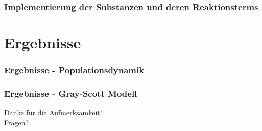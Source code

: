 \documentclass[aspectratio=32]{beamer}
\newcommand{\sectionframe}{\begin{frame}
	\begin{center}
		\textcolor{simtechred}{\Large\insertsection}
	\end{center}
\end{frame}}
\begin{document}
\begin{frame}
\frametitle{Implementierung der Substanzen und deren Reaktionsterms}

\end{frame}

\section{Ergebnisse}
\sectionframe

\begin{frame}
\frametitle{Ergebnisse - Populationsdynamik}

\end{frame}

\begin{frame}
\frametitle{Ergebnisse - Gray-Scott Modell}

\end{frame}

%
%


\begin{frame}
\begin{center}
\Large
\textcolor{simtechred}{Danke für die Aufmerksamkeit! \\ Fragen?}
\end{center}
\end{frame}
\end{document}
